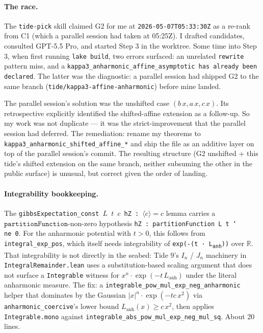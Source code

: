 \documentclass[11pt]{article}
\begin{document}
\paragraph{The race.} The \texttt{tide-pick} skill claimed G2 for me
at \texttt{2026-05-07T05:33:30Z} as a re-rank from C1 (which a
parallel session had taken at 05:25Z). I drafted candidates,
consulted GPT-5.5 Pro, and started Step 3 in the worktree. Some time
into Step 3, when first running \texttt{lake build}, two errors
surfaced: an unrelated \texttt{rewrite} pattern miss, and a
\texttt{kappa3\_anharmonic\_affine\_asymptotic has already been
declared}. The latter was the diagnostic: a parallel session had
shipped G2 to the same branch
(\texttt{tide/kappa3-affine-anharmonic}) before mine landed.

The parallel session's solution was the unshifted case
$(b\,x, a\,x, c\,x)$. Its retrospective explicitly identified the
shifted-affine extension as a follow-up. So my work was not duplicate
— it was the strict-improvement that the parallel session had
deferred. The remediation: rename my theorems to
\texttt{kappa3\_anharmonic\_shifted\_affine\_*} and ship the file as
an additive layer on top of the parallel session's commit. The
resulting structure (G2 unshifted + this tide's shifted extension on
the same branch, neither subsuming the other in the public surface)
is unusual, but correct given the order of landing.

\paragraph{Integrability bookkeeping.} The
\texttt{gibbsExpectation\_const $L$ $t$ $c$ hZ : $\langle c \rangle =
c$} lemma carries a $\mathtt{partitionFunction}$-non-zero hypothesis
\texttt{hZ : partitionFunction L t \char`\\ne 0}. For the anharmonic
potential with $t > 0$, this follows from
\texttt{integral\_exp\_pos}, which itself needs integrability of
\texttt{exp(-(t · L\textsubscript{anh}))} over $\mathbb{R}$. That
integrability is not directly in the seabed: Tide 9's $I_n$ /
$J_n$ machinery in \texttt{IntegralRemainder.lean} uses a
substitution-based scaling argument that does not surface a
\texttt{Integrable} witness for $x^n \cdot \exp(-t\,L_{\mathrm{anh}})$
under the literal anharmonic measure. The fix: a
\texttt{integrable\_pow\_mul\_exp\_neg\_anharmonic} helper that
dominates by the Gaussian
$|x|^n \cdot \exp(-tc\,x^2)$ via
\texttt{anharmonic\_coercive}'s lower bound $L_{\mathrm{anh}}(x) \geq
c\,x^2$, then applies \texttt{Integrable.mono} against
\texttt{integrable\_abs\_pow\_mul\_exp\_neg\_mul\_sq}. About 20 lines.
\end{document}
